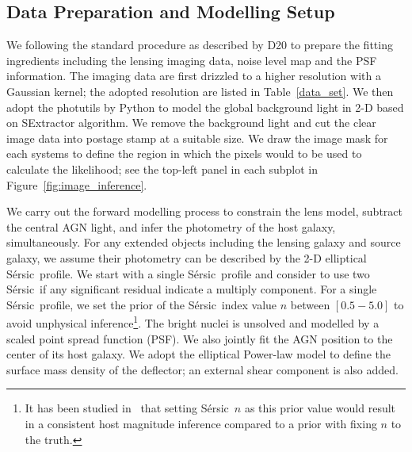 \documentclass[fleqn,usenatbib]{mnras}
\newcommand{\sersic}{S\'ersic}
\begin{document}
\subsection{Data Preparation and Modelling Setup}
We following the standard procedure as described by D20 to prepare the fitting ingredients including the lensing imaging data, noise level map and the PSF information. The imaging data are first drizzled to a higher resolution with a Gaussian kernel; the adopted resolution are listed in Table~\ref{data_set}. We then adopt the {\sc photutils} by Python to model the global background light in 2-D based on SExtractor algorithm. We remove the background light and cut the clear image data into postage stamp at a suitable size. We draw the image mask for each systems to define the region in which the pixels would to be used to calculate the likelihood; see the top-left panel in each subplot in Figure~\ref{fig:image_inference}.

We carry out the forward modelling process to constrain the lens model, subtract the central AGN light, and infer the photometry of the host galaxy, simultaneously. For any extended objects including the lensing galaxy and source galaxy, we assume their photometry can be described by the 2-D elliptical \sersic\ profile. We start with a single \sersic\ profile and consider to use two \sersic\ if any significant residual indicate a multiply component. For a single \sersic\ profile, we set the prior of the \sersic\ index value $n$ between $[0.5-5.0]$ to avoid unphysical inference\footnote{It has been studied in~\citet{Ding2017a} that setting \sersic\ $n$ as this prior value would result in a consistent host magnitude inference compared to a prior with fixing $n$ to the truth.}. The bright nuclei is unsolved and modelled by a scaled point spread function (PSF). We also jointly fit the AGN position to the center of its host galaxy. We adopt the elliptical Power-law model to define the surface mass density of the deflector; an external shear component is also added.
\end{document}
